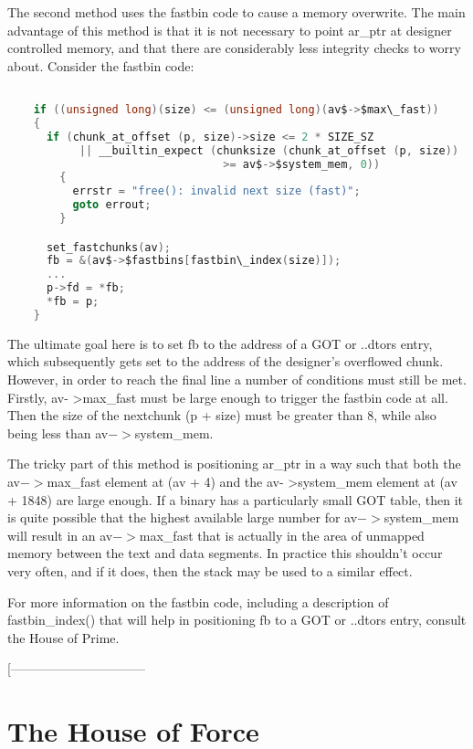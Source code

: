 \documentclass[12pt]{article}
\begin{document}
The second method uses the fastbin code to cause a memory
overwrite. The main advantage of this method is that it is not
necessary to point ar_ptr at designer controlled memory, and that
there are considerably less integrity checks to worry about.
Consider the fastbin code:
\begin{lstlisting}[language=C]

    if ((unsigned long)(size) <= (unsigned long)(av$->$max\_fast))
    {
      if (chunk_at_offset (p, size)->size <= 2 * SIZE_SZ
           || __builtin_expect (chunksize (chunk_at_offset (p, size))
                                 >= av$->$system_mem, 0))
        {
          errstr = "free(): invalid next size (fast)";
          goto errout;
        }

      set_fastchunks(av);
      fb = &(av$->$fastbins[fastbin\_index(size)]);
      ...
      p->fd = *fb;
      *fb = p;
    }
\end{lstlisting}
The ultimate goal here is to set fb to the address of a GOT or
..dtors entry, which subsequently gets set to the address of the
designer's overflowed chunk. However, in order to reach the final
line a number of conditions must still be met. Firstly, av-
>max\_fast must be large enough to trigger the fastbin code at all.
Then the size of the nextchunk (p + size) must be greater than 8,
while also being less than av$->$system_mem.
\newline


The tricky part of this method is positioning ar_ptr in a way such
that both the av$->$max\_fast element at (av + 4) and the av-
>system_mem element at (av + 1848) are large enough. If a binary
has a particularly small GOT table, then it is quite possible that
the highest available large number for av$->$system_mem will result
in an av$->$max\_fast that is actually in the area of unmapped memory
between the text and data segments. In practice this shouldn't
occur very often, and if it does, then the stack may be used to a
similar effect.
\newline


For more information on the fastbin code, including a description
of fastbin\_index() that will help in positioning fb to a GOT or
..dtors entry, consult the House of Prime.
\newline


[--------------------------------

\section{The House of Force}
\end{document}
